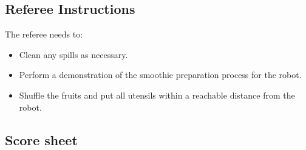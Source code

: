 \subsection*{Referee Instructions}

The referee needs to:
\begin{itemize}
	\item Clean any spills as necessary.
	\item Perform a demonstration of the smoothie preparation process for the robot.
	\item Shuffle the fruits and put all utensils within a reachable distance from the robot.
\end{itemize}

\subsection*{Score sheet}

